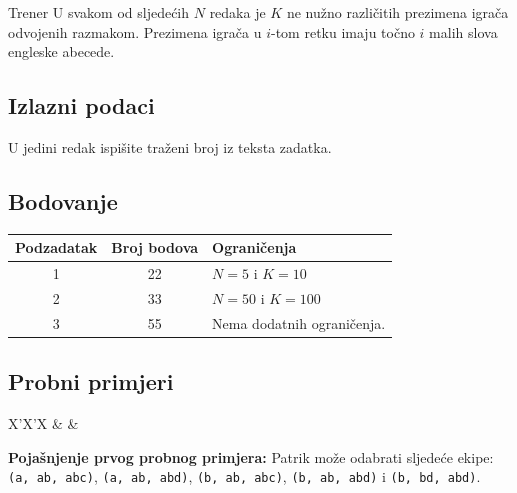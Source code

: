\begin{statement}[
  problempoints=110,
  timelimit=2 sekunde,
  memorylimit=512 MiB,
]{Trener}
U svakom od sljedećih $N$ redaka je $K$ ne nužno različitih prezimena igrača
odvojenih razmakom. Prezimena igrača u $i$-tom retku imaju točno $i$ malih slova
engleske abecede.

\subsection*{Izlazni podaci}
U jedini redak ispišite traženi broj iz teksta zadatka.

\subsection*{Bodovanje}
{\renewcommand{\arraystretch}{1.4}
  \setlength{\tabcolsep}{6pt}
  \begin{tabular}{ccl}
 Podzadatak & Broj bodova & Ograničenja \\ \midrule
  1 & 22 & $N = 5$ i $K = 10$ \\
  2 & 33 & $N = 50$ i $K = 100$\\
  3 & 55 & Nema dodatnih ograničenja. \\
\end{tabular}}

\subsection*{Probni primjeri}
\begin{tabularx}{\textwidth}{X'X'X}
 &
 &
\end{tabularx}

\textbf{Pojašnjenje prvog probnog primjera:}
Patrik može odabrati sljedeće ekipe: \texttt{(a, ab, abc)}, \texttt{(a, ab, abd)},
\texttt{(b, ab, abc)}, \texttt{(b, ab, abd)} i \texttt{(b, bd, abd)}.

\end{statement}


